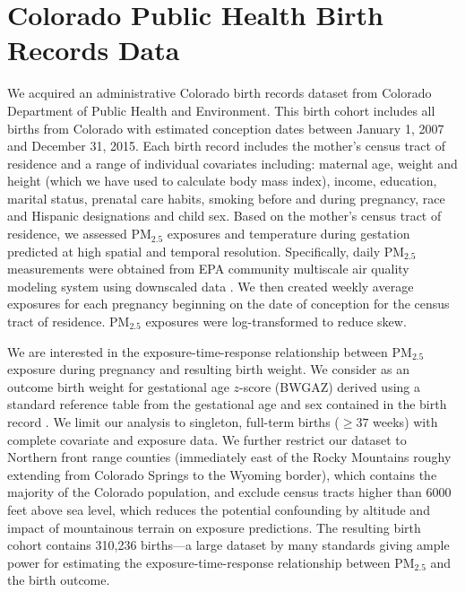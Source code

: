 \documentclass[12pt]{article}
\begin{document}
\section{Colorado Public Health Birth Records Data}\label{sec:co_birth_data}
We acquired an administrative Colorado birth records dataset from Colorado Department of Public Health and Environment. This birth cohort includes all births from Colorado with estimated conception dates between January 1, 2007 and December 31, 2015. Each birth record includes the mother's census tract of residence and a range of individual covariates including: maternal age, weight and height (which we have used to calculate body mass index), income, education, marital status, prenatal care habits, smoking before and during pregnancy, race and Hispanic designations and child sex. Based on the mother's census tract of residence, we assessed PM$_{2.5}$ exposures and temperature during gestation predicted at high spatial and temporal resolution. Specifically, daily PM$_{2.5}$ measurements were obtained from EPA community multiscale air quality modeling system using downscaled data \citep{Berrocal2010AModels}. We then created weekly average exposures for each pregnancy beginning on the date of conception for the census tract of residence. PM$_{2.5}$ exposures were log-transformed to reduce skew. 

We are interested in the exposure-time-response relationship between PM$_{2.5}$ exposure during pregnancy and resulting birth weight. We consider as an outcome birth weight for gestational age $z$-score (BWGAZ) derived using a standard reference table from the gestational age and sex contained in the birth record \citep{Fenton2013AInfants}. We limit our analysis to singleton, full-term births ($\geq37$ weeks) with complete covariate and exposure data. We further restrict our dataset to Northern front range counties (immediately east of the Rocky Mountains roughy extending from Colorado Springs to the Wyoming border), which contains the majority of the Colorado population, and exclude census tracts higher than 6000 feet above sea level, which reduces the potential confounding by altitude and impact of mountainous terrain on exposure predictions. The resulting birth cohort contains 310,236 births---a large dataset by many standards giving ample power for estimating the exposure-time-response relationship between PM$_{2.5}$ and the birth outcome. 
\end{document}
